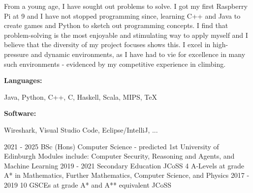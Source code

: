 \documentclass[9pt]{developercv} %
\begin{document}
\begin{minipage}[t]{0.66\textwidth}
    From a young age, I have sought out problems to solve. 
	I got my first Raspberry Pi at 9 and I have not stopped programming since, learning C++ and Java to create games and Python to sketch out programming concepts. 
	I find that problem-solving is the most enjoyable and stimulating way to apply myself and I believe that the diversity of my project focuses shows this. 
    I excel in high-pressure and dynamic environments, as I have had to vie for excellence in many such environments - evidenced by my competitive experience in climbing.
\end{minipage}
\hfill %
\begin{minipage}[t]{0.265\textwidth}
    \vspace{-6pt}
    
    \begin{minipage}[t]{0.23\textwidth}
        \textbf{Languages:}
    \end{minipage}
    \hfill
    \begin{minipage}[t]{0.60\textwidth}
      Java, Python, C++, C, Haskell, Scala, MIPS, TeX
    \end{minipage}
    \vspace{4mm}
    
    \begin{minipage}[t]{0.15\textwidth}
        \textbf{Software:}
    \end{minipage}
    \hfill
    \begin{minipage}[t]{0.68\textwidth}
      Wireshark, Visual Studio Code, Eclipse/IntelliJ, ...
    \end{minipage}
    
\end{minipage}


\vspace{-10 pt}
\begin{entrylist}
    \entry
		{2021 - 2025}
		{BSc (Hons) Computer Science - predicted 1st}
		{University of Edinburgh}
		{Modules include: Computer Security, Reasoning and Agents, and Machine Learning}
    \entry
		{2019 - 2021}
		{Secondary Education}
		{JCoSS}
		{4 A-Levels at grade A* in Mathematics, Further Mathematics, Computer Science, and Physics}
	\entry
		{2017 - 2019}
		{10 GSCEs at grade A* and A** equivalent}
		{JCoSS}
		{ }
\end{entrylist}
\end{document}

